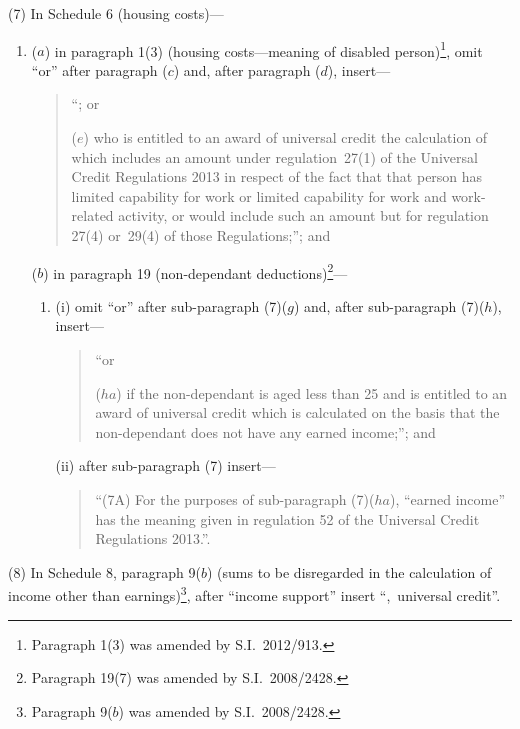 \documentclass[12pt,a4paper]{article}
\begin{document}
(7) In Schedule 6 (housing costs)—
\begin{enumerate}\item[]
($a$) in paragraph 1(3) (housing costs---meaning of disabled person)\footnote{Paragraph 1(3) was amended by S.I.~2012/913.}, omit “or” after paragraph ($c$)  and, after paragraph ($d$), insert—
\begin{quotation}
“; or

($e$) who is entitled to an award of universal credit the calculation of which includes an amount under regulation~27(1) of the Universal Credit Regulations 2013 in respect of the fact that that person has limited capability for work or limited capability for work and work-related activity, or would include such an amount but for regulation 27(4) or~29(4) of those Regulations;”; and
\end{quotation}

($b$) in paragraph 19 (non-dependant deductions)\footnote{Paragraph 19(7) was amended by S.I.~2008/2428.}—
\begin{enumerate}\item[]
(i) omit “or” after sub-paragraph (7)($g$)  and, after sub-paragraph (7)($h$), insert—
\begin{quotation}
“or

($ha$) if the non-dependant is aged less than 25 and is entitled to an award of universal credit which is calculated on the basis that the non-dependant does not have any earned income;”; and
\end{quotation}

(ii) after sub-paragraph (7) insert—
\begin{quotation}
\begin{sloppypar}
“(7A) For the purposes of sub-paragraph (7)($ha$), “earned income” has the meaning given in regulation 52 of the Universal Credit Regulations 2013.”.
\end{sloppypar}
\end{quotation}
\end{enumerate}
\end{enumerate}

(8) In Schedule 8, paragraph 9($b$)  (sums to be disregarded in the calculation of income other than earnings)\footnote{Paragraph 9($b$) was amended by S.I.~2008/2428.}, after “income support” insert “,~universal credit”.
\end{document}
